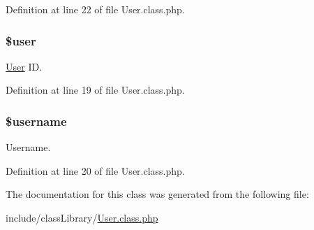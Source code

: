 Definition at line 22 of file User.\-class.\-php.

\hypertarget{classmnorman_leads_1_1_user_a598ca4e71b15a1313ec95f0df1027ca5}{
\subsubsection[{\$user}]{\setlength{\rightskip}{0pt plus 5cm}\$user\hspace{0.3cm}{\ttfamily [private]}}}\label{classmnorman_leads_1_1_user_a598ca4e71b15a1313ec95f0df1027ca5}
\hyperlink{classmnorman_leads_1_1_user}{User} I\-D. 

Definition at line 19 of file User.\-class.\-php.

\hypertarget{classmnorman_leads_1_1_user_a0eb82aa5f81cf845de4b36cd653c42cf}{
\subsubsection[{\$username}]{\setlength{\rightskip}{0pt plus 5cm}\$username\hspace{0.3cm}{\ttfamily [private]}}}\label{classmnorman_leads_1_1_user_a0eb82aa5f81cf845de4b36cd653c42cf}
Username. 

Definition at line 20 of file User.\-class.\-php.



The documentation for this class was generated from the following file\-:\begin{DoxyCompactItemize}
\item 
include/class\-Library/\hyperlink{_user_8class_8php}{User.\-class.\-php}\end{DoxyCompactItemize}
